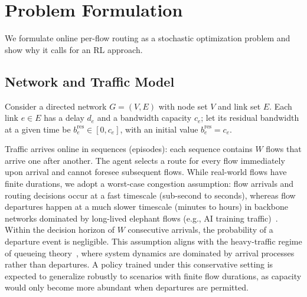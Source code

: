 \section{Problem Formulation}
\label{sec:problem}

We formulate online per-flow routing as a stochastic optimization problem and show why it calls for an RL approach.

\subsection{Network and Traffic Model}
\label{sec:problem:model}

Consider a directed network $G=(V,E)$ with node set $V$ and link set $E$. Each link $e\in E$ has a delay $d_e$ and a bandwidth capacity $c_e$; let its residual bandwidth at a given time be $b_e^{\text{res}}\in[0,c_e]$, with an initial value $b_e^{\text{res}}=c_e$.

Traffic arrives online in sequences (episodes): each sequence contains $W$ flows that arrive one after another. The agent selects a route for every flow immediately upon arrival and cannot foresee subsequent flows. While real-world flows have finite durations, we adopt a worst-case congestion assumption: flow arrivals and routing decisions occur at a fast timescale (sub-second to seconds), whereas flow departures happen at a much slower timescale (minutes to hours) in backbone networks dominated by long-lived elephant flows (e.g., AI training traffic)~\cite{benson2010microte}. Within the decision horizon of $W$ consecutive arrivals, the probability of a departure event is negligible. This assumption aligns with the heavy-traffic regime of queueing theory~\cite{kingman1961heavytraffic}, where system dynamics are dominated by arrival processes rather than departures. A policy trained under this conservative setting is expected to generalize robustly to scenarios with finite flow durations, as capacity would only become more abundant when departures are permitted.

